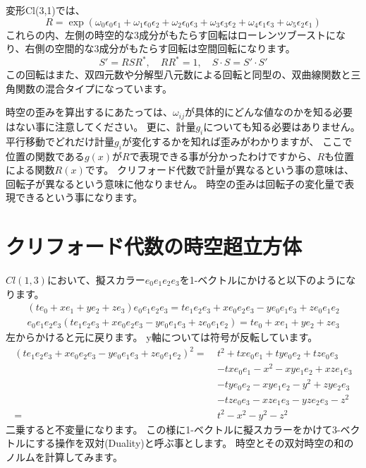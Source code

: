 \documentclass[a4paper,12pt,notitlepage]{jsreport}
\begin{document}
変形Cl(3,1)では、
\begin{equation}
  R = \exp(\omega_0 \epsilon_0\epsilon_1 + \omega_1 \epsilon_0\epsilon_2 + \omega_2 \epsilon_0\epsilon_3 + 
  \omega_3 \epsilon_3\epsilon_2 + \omega_4 \epsilon_1\epsilon_3 + \omega_5 \epsilon_2\epsilon_1)
\end{equation}
これらの内、左側の時空的な3成分がもたらす回転はローレンツブーストになり、右側の空間的な3成分がもたらす回転は空間回転になります。
\begin{equation}
  S' = R S R^* , \quad R R^* = 1 , \quad S \cdot S = S' \cdot S'
\end{equation}
この回転はまた、双四元数や分解型八元数による回転と同型の、双曲線関数と三角関数の混合タイプになっています。

時空の歪みを算出するにあたっては、$ \omega_{ij} $が具体的にどんな値なのかを知る必要はない事に注意してください。
更に、計量$ g_i $についても知る必要はありません。
平行移動でどれだけ計量$ g_i $が変化するかを知れば歪みがわかりますが、
ここで位置の関数である$ g(x) $が$ R $で表現できる事が分かったわけですから、$ R $も位置による関数$ R(x) $です。
クリフォード代数で計量が異なるという事の意味は、回転子が異なるという意味に他なりません。
時空の歪みは回転子の変化量で表現できるという事になります。

\section{クリフォード代数の時空超立方体}

$Cl(1,3)$において、擬スカラー$e_0e_1e_2e_3$を1-ベクトルにかけると以下のようになります。
\begin{equation}
  \begin{split}
    (te_0+xe_1+ye_2+ze_3)e_0e_1e_2e_3=te_1e_2e_3+xe_0e_2e_3-ye_0e_1e_3+ze_0e_1e_2\\
    e_0e_1e_2e_3(te_1e_2e_3+xe_0e_2e_3-ye_0e_1e_3+ze_0e_1e_2)=te_0+xe_1+ye_2+ze_3
  \end{split}
\end{equation}
左からかけると元に戻ります。
y軸については符号が反転しています。
\begin{equation}
  \begin{split}
    (te_1e_2e_3+xe_0e_2e_3-ye_0e_1e_3+ze_0e_1e_2)^2
    =~&t^2+txe_0e_1+tye_0e_2+tze_0e_3\\
    &-txe_0e_1-x^2-xye_1e_2+xze_1e_3\\
    &-tye_0e_2-xye_1e_2-y^2+zye_2e_3\\
    &-tze_0e_3-xze_1e_3-yze_2e_3-z^2\\
    =~&t^2-x^2-y^2-z^2
  \end{split}
\end{equation}
二乗すると不変量になります。
この様に1-ベクトルに擬スカラーをかけて3-ベクトルにする操作を双対(Duality)と呼ぶ事とします。
時空とその双対時空の和のノルムを計算してみます。
\end{document}
